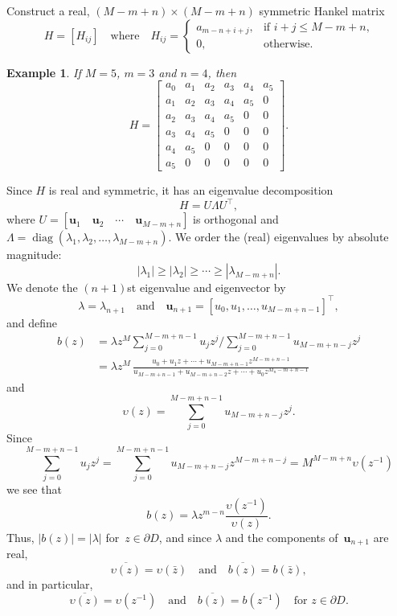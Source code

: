 \documentclass[12pt,a4paper]{article}
\newtheorem{example}[theorem]{Example}
\newcommand{\diag}{\operatorname{diag}}
\begin{document}
Construct a real, $(M-m+n)\times(M-m+n)$ symmetric Hankel matrix
\[
H=[H_{ij}]\quad\text{where}\quad
H_{ij}=\begin{cases}
    a_{m-n+i+j},&\text{if $i+j\le M-m+n$,}\\
    0,&\text{otherwise.}
\end{cases}
\]

\begin{example}
If $M=5$, $m=3$ and $n=4$, then
\[
H=\begin{bmatrix}
a_0&a_1&a_2&a_3&a_4&a_5\\
a_1&a_2&a_3&a_4&a_5&0\\
a_2&a_3&a_4&a_5&0  &0\\
a_3&a_4&a_5&0  &0  &0\\
a_4&a_5&0  &0  &0  &0\\
a_5&0  &0  &0  &0  &0
\end{bmatrix}.
\]
\end{example}

Since $H$ is real and symmetric, it has an eigenvalue decomposition
\[
H=U\Lambda U^\top,
\]
where $U=[\boldsymbol{u}_1\quad\boldsymbol{u}_2\quad\cdots
\quad\boldsymbol{u}_{M-m+n}]$ is orthogonal and 
$\Lambda=\diag(\lambda_1,\lambda_2,\ldots,
\lambda_{M-m+n})$.  We order the (real) eigenvalues by absolute magnitude:
\[
|\lambda_1|\ge|\lambda_2|\ge\cdots\ge|\lambda_{M-m+n}|.
\]
We denote the $(n+1)$st eigenvalue and eigenvector by
\[
\lambda=\lambda_{n+1}\quad\text{and}\quad
\boldsymbol{u}_{n+1}=[u_0,u_1,\ldots,u_{M-m+n-1}]^\top,
\]
and define
\begin{align*}
b(z)&=\lambda z^M\sum_{j=0}^{M-m+n-1}u_jz^j\bigg/
\sum_{j=0}^{M-m+n-1}u_{M-m+n-j}z^j\\
    &=\lambda z^M\,\frac{u_0+u_1z+\cdots+u_{M-m+n-1}z^{M-m+n-1}}%
{u_{M-m+n-1}+u_{M-m+n-2}z+\cdots+u_0z^{M_n-m+n-1}}
\end{align*}
and
\begin{equation}\label{eq: upsilon}
\upsilon(z)=\sum_{j=0}^{M-m+n-1}u_{M-m+n-j}z^j.
\end{equation}
Since
\[
\sum_{j=0}^{M-m+n-1}u_jz^j=\sum_{j=0}^{M-m+n-1}u_{M-m+n-j}z^{M-m+n-j}
    =M^{M-m+n}\upsilon(z^{-1})
\]
we see that
\[
b(z)=\lambda z^{m-n}\frac{\upsilon(z^{-1})}{\upsilon(z)}.
\]
Thus, $|b(z)|=|\lambda|$ for~$z\in\partial D$, and since $\lambda$ and the 
components of~$\boldsymbol{u}_{n+1}$ are real,
\begin{equation}\label{eq: b zbar}
\overline{\upsilon(z)}=\upsilon(\bar z)\quad\text{and}\quad
\overline{b(z)}=b(\bar z), 
\end{equation}
and in particular,
\[
\overline{\upsilon(z)}=\upsilon(z^{-1})\quad\text{and}\quad
\overline{b(z)}=b(z^{-1})\quad\text{for $z\in\partial D$.}
\]
\end{document}
